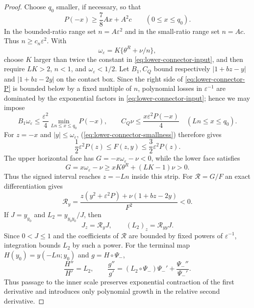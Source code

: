 \begin{proof}
Choose $q_0$ smaller, if necessary, so that
\begin{equation}\label{eq:lower-connector-P}
 P(-x)\ge \frac78Ax+A^2c\qquad(0\le x\le q_0).
\end{equation}
In the bounded-ratio range set $n=A\varepsilon^2$ and in the small-ratio
range set $n=Ac$.  Thus $n\ge c_n\varepsilon^2$.  With
\[
 \omega_\varepsilon=K\{\theta^R+\nu/n\},
\]
choose $K$ larger than twice the constant in
\eqref{eq:lower-connector-input}, and then require $LK>2$, $n<1$, and
$\omega_\varepsilon<1/2$.  Let $B_1,C_Q$ bound respectively
$|1+bz-y|$ and $|1+bz-2y|$ on the contact box.  Since the right side of
\eqref{eq:lower-connector-P} is bounded below by a fixed multiple of
$n$, polynomial losses in $\varepsilon^{-1}$ are dominated by the
exponential factors in \eqref{eq:lower-connector-input}; hence we may impose
\begin{equation}\label{eq:lower-connector-smallness}
 B_1\omega_\varepsilon\le \frac{\varepsilon^2}{4}
       \min_{Ln\le x\le q_0}P(-x),\qquad
 C_Q\nu\le \frac{x\varepsilon^2P(-x)}{4}
       \quad(Ln\le x\le q_0).
\end{equation}
For $z=-x$ and $|y|\le\omega_\varepsilon$, (\ref{eq:lower-connector-smallness})
therefore gives
\begin{equation}\label{eq:lower-connector-F}
 \frac12\varepsilon^2P(z)\le F(z,y)
 \le \frac32\varepsilon^2P(z).
\end{equation}
The upper horizontal face has $G=-x\omega_\varepsilon-\nu<0$, while the
lower face satisfies
\[
 G=x\omega_\varepsilon-\nu\ge xK\theta^R+(LK-1)\nu>0.
\]
Thus the signed interval reaches $z=-Ln$ inside this strip.  For
$\mathcal R=G/F$ an exact differentiation gives
\begin{equation}\label{eq:lower-connector-Ry}
 \mathcal R_y=\frac{z(y^2+\varepsilon^2P)+\nu(1+bz-2y)}{F^2}<0.
\end{equation}
If $J=y_{y_0}$ and $L_2=y_{y_0y_0}/J$, then
\begin{equation}\label{eq:lower-connector-variations}
 J_z=\mathcal R_yJ,\qquad (L_2)_z=\mathcal R_{yy}J.
\end{equation}
Since $0<J\le1$ and the coefficients of $\mathcal R$ are bounded by fixed
powers of $\varepsilon^{-1}$, integration bounds $L_2$ by such a power.
For the terminal map $H(y_0)=y(-Ln;y_0)$ and $g=H\circ\Psi_-$,
\[
 \frac{H''}{H'}=L_2,\qquad
 \frac{g''}{g'}=(L_2\circ\Psi_-)\Psi_-'
                         +\frac{\Psi_-''}{\Psi_-'}.
\]
Thus passage to the inner scale preserves exponential contraction of
the first derivative and introduces only polynomial growth in the
relative second derivative.


\end{proof}
